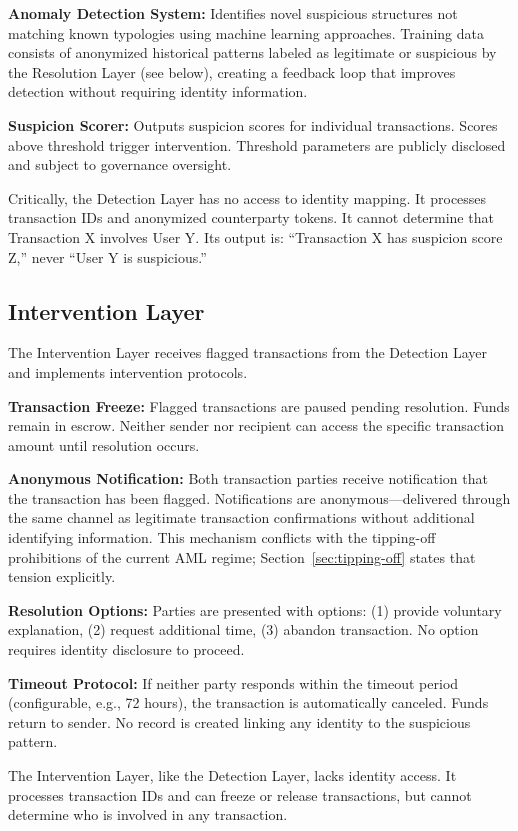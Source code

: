 \documentclass[11pt]{article}
\begin{document}
\textbf{Anomaly Detection System:} Identifies novel suspicious structures not matching known typologies using machine learning approaches. Training data consists of anonymized historical patterns labeled as legitimate or suspicious by the Resolution Layer (see below), creating a feedback loop that improves detection without requiring identity information.

\textbf{Suspicion Scorer:} Outputs suspicion scores for individual transactions. Scores above threshold trigger intervention. Threshold parameters are publicly disclosed and subject to governance oversight.

Critically, the Detection Layer has no access to identity mapping. It processes transaction IDs and anonymized counterparty tokens. It cannot determine that Transaction X involves User Y. Its output is: ``Transaction X has suspicion score Z,'' never ``User Y is suspicious.''

\subsection{Intervention Layer}

The Intervention Layer receives flagged transactions from the Detection Layer and implements intervention protocols.

\textbf{Transaction Freeze:} Flagged transactions are paused pending resolution. Funds remain in escrow. Neither sender nor recipient can access the specific transaction amount until resolution occurs.

\textbf{Anonymous Notification:} Both transaction parties receive notification that the transaction has been flagged. Notifications are anonymous---delivered through the same channel as legitimate transaction confirmations without additional identifying information. This mechanism conflicts with the tipping-off prohibitions of the current AML regime; Section~\ref{sec:tipping-off} states that tension explicitly.

\textbf{Resolution Options:} Parties are presented with options: (1) provide voluntary explanation, (2) request additional time, (3) abandon transaction. No option requires identity disclosure to proceed.

\textbf{Timeout Protocol:} If neither party responds within the timeout period (configurable, e.g., 72 hours), the transaction is automatically canceled. Funds return to sender. No record is created linking any identity to the suspicious pattern.

The Intervention Layer, like the Detection Layer, lacks identity access. It processes transaction IDs and can freeze or release transactions, but cannot determine who is involved in any transaction.
\end{document}
